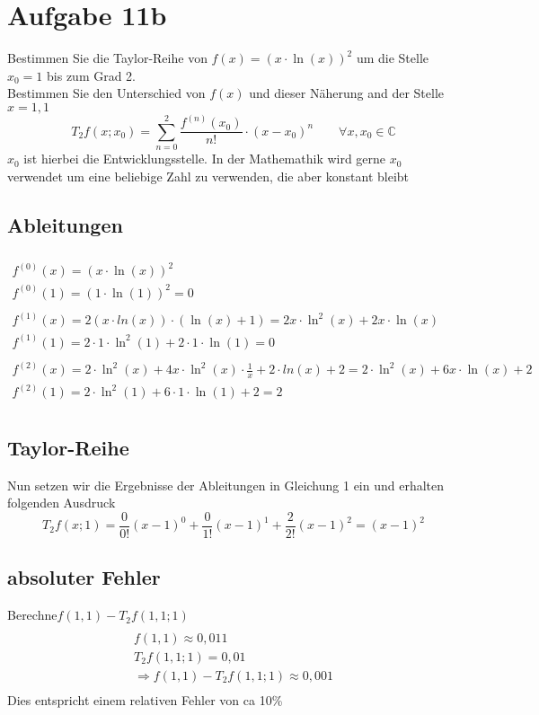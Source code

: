 \documentclass[18pt,a4paper]{article}
\begin{document}
\section*{Aufgabe 11b}
Bestimmen Sie die Taylor-Reihe von $f(x)=(x\cdot\ln(x))^2$ um die Stelle $x_0 = 1$ bis zum Grad 2.\\
Bestimmen Sie den Unterschied von $f(x)$ und dieser Näherung and der Stelle $x=1,1$
\begin{equation}
T_2f(x;x_0)= \sum_{n=0}^{2}\frac{f^{(n)}(x_0)}{n!} \cdot (x-x_0)^n \qquad\forall x,x_0 \in \mathbb{C}
\end{equation}
$x_0$ ist hierbei die Entwicklungsstelle. In der Mathemathik wird gerne $x_0$ verwendet um eine beliebige Zahl zu verwenden, die aber konstant bleibt
\subsection*{Ableitungen}
\begin{multline*}
\\
f^{(0)}(x)=(x\cdot\ln(x))^2\\
f^{(0)}(1)= (1\cdot\ln(1))^2 = 0\\
\\
f^{(1)}(x) = 2(x\cdot ln(x))\cdot(\ln(x)+1) = 2x\cdot\ln^2(x)+ 2x\cdot \ln(x)\\
f^{(1)}(1) = 2\cdot1\cdot\ln^2(1)+ 2\cdot 1\cdot \ln(1) = 0\\
\\
f^{(2)}(x) = 2\cdot\ln^2(x) + 4 x\cdot\ln^2(x) \cdot \frac{1}{x} + 2\cdot ln(x) + 2 =  2\cdot\ln^2(x) +  6 x \cdot\ln(x) + 2\\
f^{(2)}(1) = 2\cdot\ln^2(1) +  6\cdot 1 \cdot\ln(1) + 2 = 2\\
\end{multline*}
\subsection*{Taylor-Reihe}
Nun setzen wir die Ergebnisse der Ableitungen in Gleichung 1 ein und erhalten folgenden Ausdruck
\begin{equation*}
T_2f(x;1)= \frac{0}{0!}(x-1)^0 + \frac{0}{1!}(x-1)^1 + \frac{2}{2!}(x-1)^2 = (x-1)^2
\end{equation*}
\subsection*{absoluter Fehler}
Berechne$f(1,1) - T_2f(1,1;1)$\\
\begin{multline*}
\\
f(1,1) \approx 0,011\\
T_2f(1,1;1) = 0,01\\
\Rightarrow f(1,1) - T_2f(1,1;1) \approx 0,001\\
\end{multline*}
Dies entspricht einem relativen Fehler von ca 10\%
\end{document}
